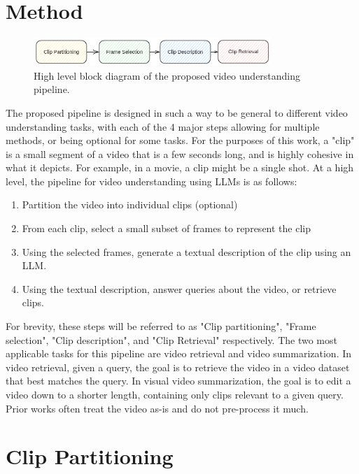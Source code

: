 \documentclass{article}
\begin{document}
\section{Method}

\begin{figure}
      \centering
      \includegraphics[width=0.8\textwidth]{figures/pipeline.png}
      \caption{High level block diagram of the proposed video understanding pipeline.}
      \label{fig:pipeline}
\end{figure}

The proposed pipeline is designed in such a way to be general to different video understanding tasks, with each of the 4 major steps allowing for multiple methods, or being optional for some tasks.
For the purposes of this work, a "clip" is a small segment of a video that is a few seconds long, 
and is highly cohesive in what it depicts. For example, in a movie, a clip might be a single shot.
At a high level, the pipeline for video understanding using LLMs is as follows:
\begin{enumerate}
      \item Partition the video into individual clips (optional)
      \item From each clip, select a small subset of frames to represent the clip
      \item Using the selected frames, generate a textual description of the clip using an LLM.
      \item Using the textual description, answer queries about the video, or retrieve clips.
\end{enumerate}

For brevity, these steps will be referred to as "Clip partitioning", "Frame selection", "Clip description", and "Clip Retrieval" respectively.
The two most applicable tasks for this pipeline are video retrieval and video summarization.
In video retrieval, given a query, the goal is to retrieve the video in a video dataset that best matches the query.
In visual video summarization, the goal is to edit a video down to a shorter length, containing only clips relevant to a given query.
Prior works often treat the video as-is and do not pre-process it much.



\section{Clip Partitioning}
\end{document}
